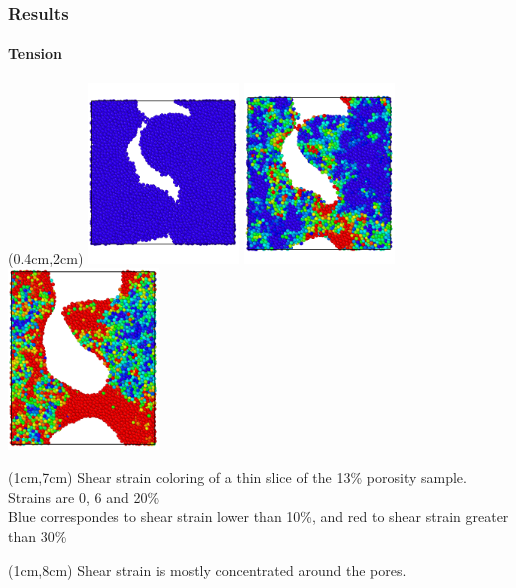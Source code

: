 \begin{frame}
    \frametitle{Results}
    \framesubtitle{Tension}
    \begin{textblock*}{6.5cm}(0.4cm,2cm) %
        \includegraphics[width=4cm]{Presentacion_PANACM_Franco/13_0strain.png}
        \includegraphics[width=4cm]{Presentacion_PANACM_Franco/13_6strain_tens.png}
        \includegraphics[width=4cm]{Presentacion_PANACM_Franco/13_20strain_tens_2.png}
    \end{textblock*}
    \begin{textblock*}{11cm}(1cm,7cm) %
        \centering
        \tiny{Shear strain coloring of a thin slice of the 13\% porosity sample. Strains are 0, 6 and 20\%\\Blue correspondes to shear strain lower than 10\%, and red to shear strain greater than 30\%}
    \end{textblock*}
    \begin{textblock*}{11.5cm}(1cm,8cm) %
        Shear strain is mostly concentrated around the pores.
    \end{textblock*}
\end{frame}

